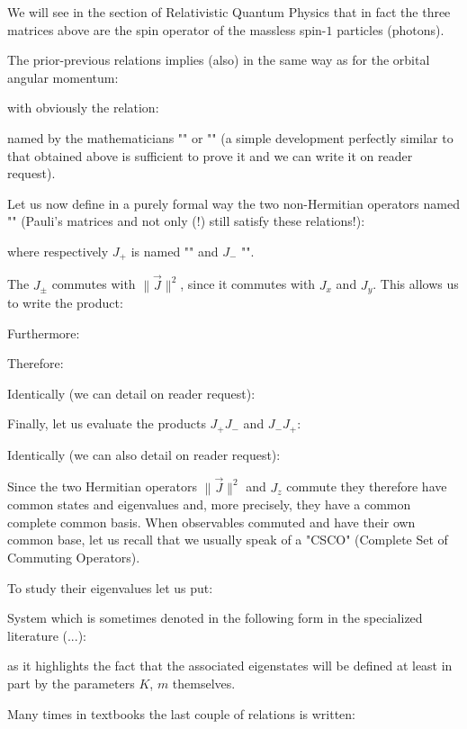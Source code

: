 	\begin{tcolorbox}[title=Remark,colframe=black,arc=10pt]
	We will see in the section of Relativistic Quantum Physics that in fact the three matrices above are the spin operator of the massless spin-$1$ particles (photons).
	\end{tcolorbox}
	The prior-previous relations implies (also) in the same way as for the orbital angular momentum:
	
	with obviously the relation:
	
	named by the mathematicians "" or "" (a simple development perfectly similar to that obtained above is sufficient to prove it and we can write it on reader request).
	
	Let us now define in a purely formal way the two non-Hermitian operators named "" (Pauli's matrices and not only (!) still satisfy these relations!):
	
	where respectively $J_+$ is named "" and $J_-$ "".

	The $J_{\pm}$ commutes with $\|\vec{J}\|^2$, since it commutes with $J_x$ and $J_y$. This allows us to write the product:
	
	Furthermore:
	
	Therefore:
	
	Identically (we can detail on reader request):
	
	Finally, let us evaluate the products $J_+J_-$ and $J_-J_+$:
	
	Identically (we can also detail on reader request):
	
	Since the two Hermitian operators $\|\vec{J}\|^2$ and $J_z$ commute they therefore have common states and eigenvalues and, more precisely, they have a common complete common basis. When observables commuted and have their own common base, let us recall that we usually speak of a "CSCO" (Complete Set of Commuting Operators).
	
	To study their eigenvalues let us put:
	
	System which is sometimes denoted in the following form in the specialized literature (...):
	
	as it highlights the fact that the associated eigenstates will be defined at least in part by the parameters $K$, $m$ themselves.
	
	Many times in textbooks the last couple of relations is written:
	
